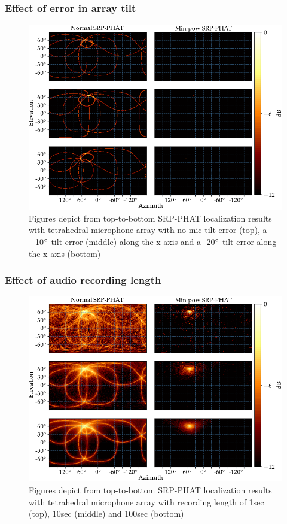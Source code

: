 \subsubsection{Effect of error in array tilt}
\begin{figure}[H]
    \centering
    \includegraphics[width=\textwidth]{Figures/micErrTiltSim.png}
    \caption{Figures depict from top-to-bottom SRP-PHAT localization results with tetrahedral microphone array with no mic tilt error (top), a +10$\degree$ tilt  error (middle) along the x-axis and a -20$\degree$ tilt error along the x-axis (bottom)}
    \label{fig:micErrTilt}
\end{figure}
\subsubsection{Effect of audio recording length}
\begin{figure}[H]
    \centering
    \includegraphics[width=\textwidth]{Figures/audioLenSim.png}
    \caption{Figures depict from top-to-bottom SRP-PHAT localization results with tetrahedral microphone array with recording length of 1sec  (top), 10sec (middle) and 100sec (bottom)}
    \label{fig:micErrTilt}
\end{figure}

